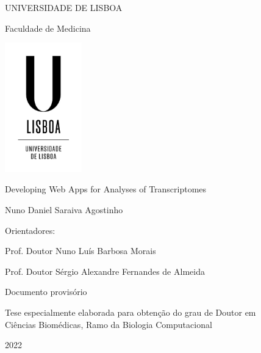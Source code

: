 \documentclass[12pt, twoside]{report}
\begin{document}
\begin{titlepage}
    \begin{center}
        \vspace*{-.2cm}
        UNIVERSIDADE DE LISBOA
        
        Faculdade de Medicina
        
        \includegraphics[width=0.25\textwidth]{images/logo/ulisboa-only}
        
        \vspace{1.8cm}
        Developing Web Apps for Analyses of Transcriptomes

        \vspace{1.1cm}        
            
        \vspace{0.9cm}            
        Nuno Daniel Saraiva Agostinho
    \end{center}

    \vspace{0.9cm}
    Orientadores:

      Prof. Doutor Nuno Luís Barbosa Morais

      Prof. Doutor Sérgio Alexandre Fernandes de Almeida
    
    \vspace{1.6cm}
    \begin{center}
        Documento provisório
        
        Tese especialmente elaborada para obtenção do grau de Doutor em\\
        Ciências Biomédicas, Ramo da Biologia Computacional
            
        \vfill
        2022
        \vspace{.7cm}    
    \end{center}
\end{titlepage}
\end{document}

